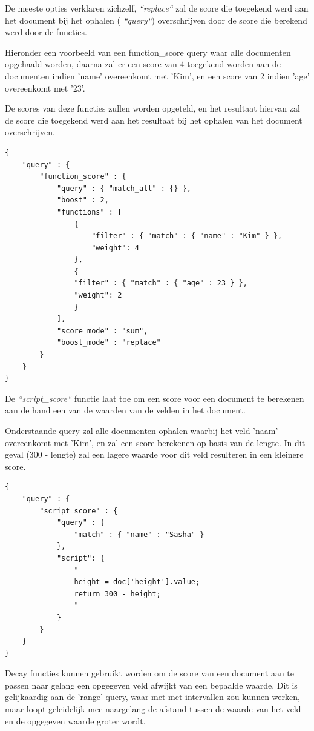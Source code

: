 De meeste opties verklaren zichzelf, \textit{``replace``} zal de score die toegekend werd aan het document bij het ophalen ( \textit{``query``}) overschrijven door de score die berekend werd door de functies. 

Hieronder een voorbeeld van een function\_score query waar alle documenten opgehaald worden, daarna zal er een score van 4 toegekend worden aan de documenten indien 'name' overeenkomt met 'Kim', en een score van 2 indien 'age' overeenkomt met '23'.

De scores van deze functies zullen worden opgeteld, en het resultaat hiervan zal de score die toegekend werd aan het resultaat bij het ophalen van het document overschrijven. 

\begin{lstlisting}[caption={Scoring: voorbeeld van een function\_score query}]
{
	"query" : {
		"function_score" : {
			"query" : { "match_all" : {} },
			"boost" : 2,
			"functions" : [
				{
					"filter" : { "match" : { "name" : "Kim" } },
					"weight": 4
				},
				{
				"filter" : { "match" : { "age" : 23 } },
				"weight": 2
				}
			],
			"score_mode" : "sum",
			"boost_mode" : "replace"
		}
	}
}
\end{lstlisting}

De \textit{``script\_score``} functie laat toe om een score voor een document te berekenen aan de hand een van de waarden van de velden in het document.

Onderstaande query zal alle documenten ophalen waarbij het veld 'naam' overeenkomt met 'Kim', en zal een score berekenen op basis van de lengte. In dit geval (300 - lengte) zal een lagere waarde voor dit veld resulteren in een kleinere score.

\begin{lstlisting}[caption={Scoring: voorbeeld van een script\_score query}]
{
	"query" : {
		"script_score" : {
			"query" : {
				"match" : { "name" : "Sasha" }
			},
			"script": {
				"
				height = doc['height'].value;
				return 300 - height;
				"
			}
		}
	}
}
\end{lstlisting}

Decay functies kunnen gebruikt worden om de score van een document aan te passen naar gelang een opgegeven veld afwijkt van een bepaalde waarde. Dit is gelijkaardig aan de 'range' query, waar met met intervallen zou kunnen werken, maar loopt geleidelijk mee naargelang de afstand tussen de waarde van het veld en de opgegeven waarde groter wordt. 
\newline

